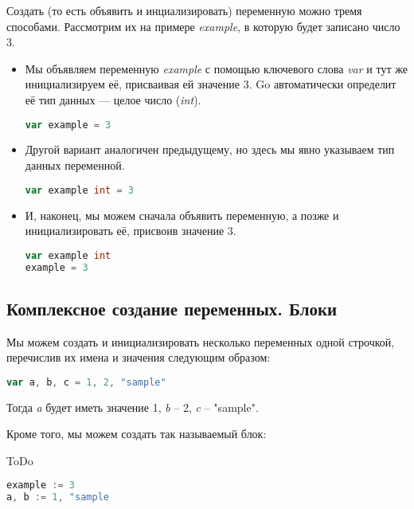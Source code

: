 \documentclass{book}
\begin{document}
Создать (то есть объявить и инциализировать) переменную можно тремя способами. Рассмотрим их на примере \textit{example}, в которую будет записано число 3.
\begin{itemize}
    \item Мы объявляем переменную \textit{example} с помощью ключевого слова \textit{var} и тут же инициализируем её, присваивая ей значение 3. Go автоматически определит её тип данных --- целое число (\textit{int}).
\begin{lstlisting}[language=go,style=lststyle:golang]
var example = 3
\end{lstlisting}

    \item Другой вариант аналогичен предыдущему, но здесь мы явно указываем тип данных переменной.
\begin{lstlisting}[language=go,style=lststyle:golang]
var example int = 3
\end{lstlisting}

    \item И, наконец, мы можем сначала объявить переменную, а позже и инициализировать её, присвоив значение 3.
\begin{lstlisting}[language=go,style=lststyle:golang]
var example int
example = 3
\end{lstlisting}

\end{itemize}

\subsection{Комплексное создание переменных. Блоки}
Мы можем создать и инициализировать несколько переменных одной строчкой, перечислив их имена и значения следующим образом:
\begin{lstlisting}[language=go,style=lststyle:golang]
var a, b, c = 1, 2, "sample"
\end{lstlisting}

Тогда \textit{a} будет иметь значение 1, \textit{b} -- 2, \textit{c} -- "sample".

Кроме того, мы можем создать так называемый блок:



ToDo

\begin{lstlisting}[language=go,style=lststyle:golang]
example := 3
a, b := 1, "sample
\end{lstlisting}
\end{document}
